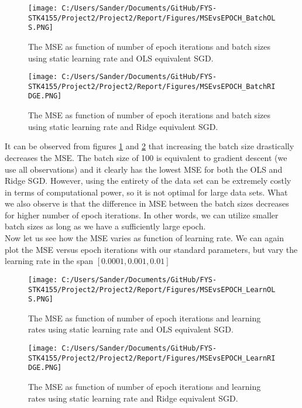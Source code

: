 \documentclass[12pt,a4paper]{article}
\begin{document}
\begin{figure}[H]
\centering
\texttt{[image: C:/Users/Sander/Documents/GitHub/FYS-STK4155/Project2/Project2/Report/Figures/MSEvsEPOCH\_BatchOLS.PNG]}
\caption{\label{fig:MSEvsEPOCHbatchOLS} The MSE as function of number of epoch iterations and batch sizes using static learning rate and OLS equivalent SGD.}
\end{figure}

\begin{figure}[H]
\centering
\texttt{[image: C:/Users/Sander/Documents/GitHub/FYS-STK4155/Project2/Project2/Report/Figures/MSEvsEPOCH\_BatchRIDGE.PNG]}
\caption{\label{fig:MSEvsEPOCHbatchRIDGE} The MSE as function of number of epoch iterations and batch sizes using static learning rate and Ridge equivalent SGD.}
\end{figure}

\noindent It can be observed from figures \ref{fig:MSEvsEPOCHbatchOLS} and \ref{fig:MSEvsEPOCHbatchRIDGE} that increasing the batch size drastically decreases the MSE. The batch size of 100 is equivalent to gradient descent (we use all observations) and it clearly has the lowest MSE for both the OLS and Ridge SGD. However, using the entirety of the data set can be extremely costly in terms of computational power, so it is not optimal for large data sets. What we also observe is that the difference in MSE between the batch sizes decreases for higher number of epoch iterations. In other words, we can utilize smaller batch sizes as long as we have a sufficiently large epoch. 
\\
Now let us see how the MSE varies as function of learning rate. We can again plot the MSE versus epoch iterations with our standard parameters, but vary the learning rate in the span $[0.0001, 0.001, 0.01]$

\begin{figure}[H]
\centering
\texttt{[image: C:/Users/Sander/Documents/GitHub/FYS-STK4155/Project2/Project2/Report/Figures/MSEvsEPOCH\_LearnOLS.PNG]}
\caption{\label{fig:MSEvsEPOCHlaernOLS} The MSE as function of number of epoch iterations and learning rates using static learning rate and OLS equivalent SGD.}
\end{figure}

\begin{figure}[H]
\centering
\texttt{[image: C:/Users/Sander/Documents/GitHub/FYS-STK4155/Project2/Project2/Report/Figures/MSEvsEPOCH\_LearnRIDGE.PNG]}
\caption{\label{fig:MSEvsEPOCHlearnRIDGE} The MSE as function of number of epoch iterations and learning rates using static learning rate and Ridge equivalent SGD.}
\end{figure}
\end{document}

